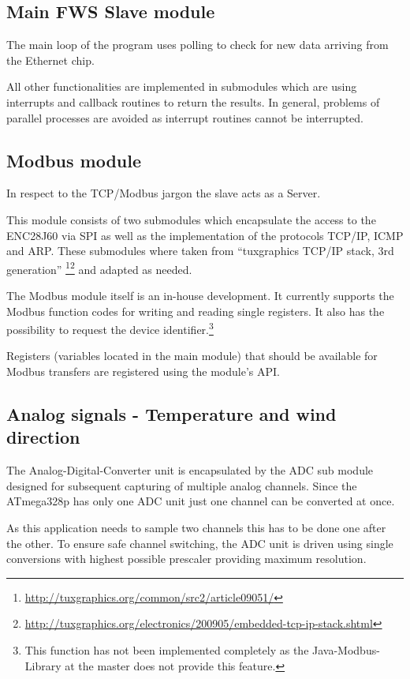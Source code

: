 \subsection{Main FWS Slave module}
The main loop of the program uses polling to check for new data arriving from the Ethernet chip.

All other functionalities are implemented in submodules which are using interrupts and callback routines to return the results. In general, problems of parallel processes are avoided as interrupt routines cannot be interrupted.

\subsection{Modbus module}
In respect to the TCP/Modbus jargon the slave acts as a Server.

This module consists of two submodules which encapsulate the access to the ENC28J60 via SPI as well as the implementation of the protocols TCP/IP, ICMP and ARP. These submodules where taken from ``tuxgraphics TCP/IP stack, 3rd generation'' \footnote{\url{http://tuxgraphics.org/common/src2/article09051/}}\footnote{\url{http://tuxgraphics.org/electronics/200905/embedded-tcp-ip-stack.shtml}} and adapted as needed.

The Modbus module itself is an in-house development. It currently supports the Modbus function codes for writing and reading single registers. It also has the possibility to request the device identifier.\footnote{This function has not been implemented completely as the Java-Modbus-Library at the master does not provide this feature.}	

Registers (variables located in the main module) that should be available for Modbus transfers are registered using the module's API.

\subsection{Analog signals - Temperature and wind direction}
The Analog-Digital-Converter unit is encapsulated by the ADC sub module designed for subsequent capturing of multiple analog channels.
Since the ATmega328p has only one ADC unit just one channel can be converted at once.

As this application needs to sample two channels this has to be done one after the other. To ensure safe channel switching, the ADC unit is driven using single conversions with highest possible prescaler providing maximum resolution.

